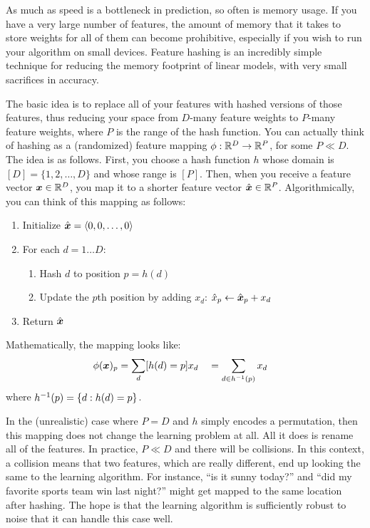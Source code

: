 As much as speed is a bottleneck in prediction, so often is memory
usage.  If you have a very large number of features, the amount of
memory that it takes to store weights for all of them can become
prohibitive, especially if you wish to run your algorithm on small
devices.  Feature hashing is an incredibly simple technique for
reducing the memory footprint of linear models, with very small
sacrifices in accuracy.

The basic idea is to replace all of your features with hashed versions
of those features, thus reducing your space from $D$-many feature
weights to $P$-many feature weights, where $P$ is the range of the
hash function.  You can actually think of hashing as a (randomized)
feature mapping $\phi : \mathbb{R}^D \rightarrow \mathbb{R}^P$, for some $P \ll D$.  The idea
is as follows.  First, you choose a hash function $h$ whose domain is
$[D] = \{ 1, 2, \dots, D \}$ and whose range is $[P]$.  Then, when you
receive a feature vector ${\boldsymbol{x}} \in \mathbb{R}^D$, you map it to a shorter
feature vector $\hat{{\boldsymbol{x}}} \in \mathbb{R}^P$.  Algorithmically, you can think of
this mapping as follows:

\begin{enumerate}
  \item Initialize $\hat{{\boldsymbol{x}}} = \langle 0, 0, \dots, 0 \rangle$
  \item For each $d = 1 \dots D$:
    \begin{enumerate}
      \item Hash $d$ to position $p = h(d)$
      \item Update the $p$th position by adding $x_d$: $\hat x_p \leftarrow \hat{{\boldsymbol{x}}}_p + x_d$
    \end{enumerate}
  \item Return $\hat{{\boldsymbol{x}}}$
\end{enumerate}

\noindent
Mathematically, the mapping looks like:
%
\begin{align}
  \phi({\boldsymbol{x}})_p
  &= \sum_d [h(d) = p] x_d 
  \quad= \sum_{d \in h^{-1}(p)} x_d
\end{align}
%
where $h^{-1}(p) = \{ d : h(d) = p \}$.

In the (unrealistic) case where $P = D$ and $h$ simply encodes a
permutation, then this mapping does not change the learning problem at
all.  All it does is rename all of the features.  In practice, $P \ll
D$ and there will be collisions.  In this context, a collision means
that two features, which are really different, end up looking the same
to the learning algorithm.  For instance, ``is it sunny today?'' and
``did my favorite sports team win last night?'' might get mapped to
the same location after hashing.  The hope is that the learning
algorithm is sufficiently robust to noise that it can handle this case
well.

